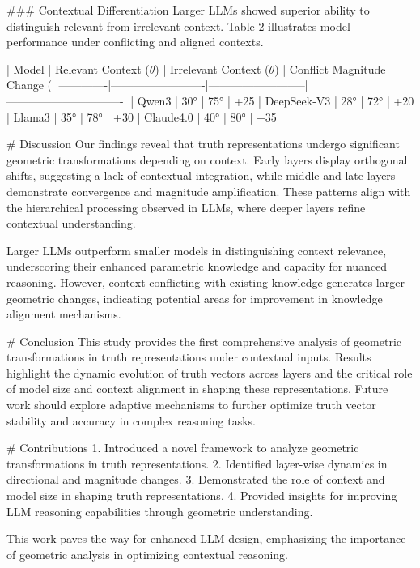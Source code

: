 ### Contextual Differentiation  
Larger LLMs showed superior ability to distinguish relevant from irrelevant context. Table 2 illustrates model performance under conflicting and aligned contexts.  

| Model       | Relevant Context ($θ$) | Irrelevant Context ($θ$) | Conflict Magnitude Change (%
|-------------|-------------------------|--------------------------|-------------------------------|  
| Qwen3       | 30°                    | 75°                     | +25%
| DeepSeek-V3 | 28°                    | 72°                     | +20%
| Llama3      | 35°                    | 78°                     | +30%
| Claude4.0   | 40°                    | 80°                     | +35%

# Discussion  
Our findings reveal that truth representations undergo significant geometric transformations depending on context. Early layers display orthogonal shifts, suggesting a lack of contextual integration, while middle and late layers demonstrate convergence and magnitude amplification. These patterns align with the hierarchical processing observed in LLMs, where deeper layers refine contextual understanding.  

Larger LLMs outperform smaller models in distinguishing context relevance, underscoring their enhanced parametric knowledge and capacity for nuanced reasoning. However, context conflicting with existing knowledge generates larger geometric changes, indicating potential areas for improvement in knowledge alignment mechanisms.  

# Conclusion  
This study provides the first comprehensive analysis of geometric transformations in truth representations under contextual inputs. Results highlight the dynamic evolution of truth vectors across layers and the critical role of model size and context alignment in shaping these representations. Future work should explore adaptive mechanisms to further optimize truth vector stability and accuracy in complex reasoning tasks.  

# Contributions  
1. Introduced a novel framework to analyze geometric transformations in truth representations.  
2. Identified layer-wise dynamics in directional and magnitude changes.  
3. Demonstrated the role of context and model size in shaping truth representations.  
4. Provided insights for improving LLM reasoning capabilities through geometric understanding.  

This work paves the way for enhanced LLM design, emphasizing the importance of geometric analysis in optimizing contextual reasoning.